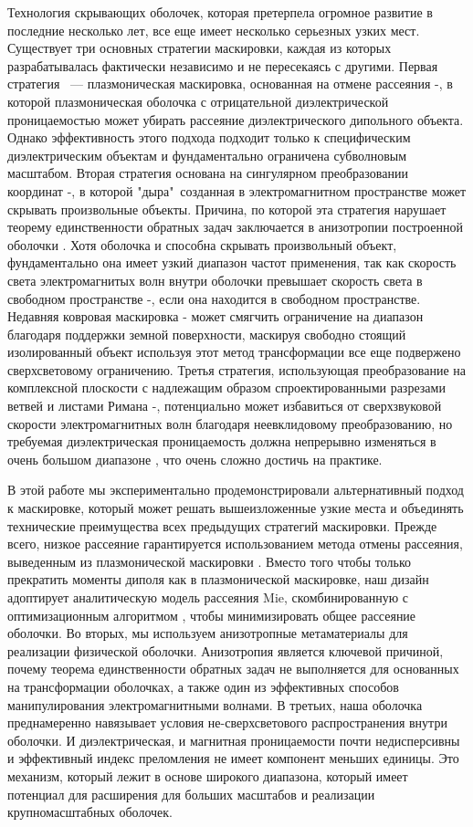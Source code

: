 \documentclass[a4paper, 12pt]{article}
\begin{document}
Технология скрывающих оболочек, которая претерпела огромное развитие в 
последние несколько лет, все еще имеет несколько серьезных узких мест.
Существует три основных стратегии маскировки, каждая из которых разрабатывалась
фактически независимо и не пересекаясь с другими. Первая стратегия ~--- 
плазмоническая маскировка, основанная на отмене рассеяния 
\cite{1}-\cite{3}, в которой
плазмоническая оболочка с отрицательной диэлектрической проницаемостью может
убирать рассеяние диэлектрического дипольного объекта. Однако эффективность
этого подхода подходит только к специфическим диэлектрическим объектам
и фундаментально ограничена субволновым масштабом. Вторая стратегия основана
на сингулярном преобразовании координат \cite{4}-\cite{7}, 
в которой "дыра"\, созданная
в электромагнитном пространстве может скрывать произвольные объекты. 
Причина, по которой эта стратегия нарушает теорему единственности обратных
задач заключается в анизотропии построенной оболочки \cite{5}. Хотя оболочка и 
способна скрывать произвольный объект, фундаментально она имеет узкий диапазон
частот применения, так как скорость света электромагнитых волн внутри оболочки
превышает скорость света в свободном пространстве \cite{8}-\cite{10}, 
если она находится в свободном
пространстве. Недавняя ковровая маскировка \cite{11}-\cite{18} 
может смягчить ограничение
на диапазон благодаря поддержки земной поверхности, маскируя свободно стоящий
изолированный объект используя этот метод трансформации все еще подвержено
сверхсветовому ограничению. Третья стратегия, использующая преобразование
на комплексной плоскости с надлежащим образом спроектированными разрезами 
ветвей и листами Римана \cite{19}-\cite{20}, потенциально может избавиться от 
сверхзвуковой скорости электромагнитных волн благодаря неевклидовому 
преобразованию, но требуемая диэлектрическая проницаемость должна непрерывно 
изменяться в очень большом диапазоне \cite{21}, 
что очень сложно достичь на практике. 

В этой работе мы экспериментально продемонстрировали альтернативный подход
к маскировке, который может решать вышеизложенные узкие места и объединять
технические преимущества всех предыдущих стратегий маскировки. Прежде всего,
низкое рассеяние гарантируется использованием метода отмены рассеяния,
выведенным из плазмонической маскировки \cite{1}. Вместо того чтобы только 
прекратить моменты диполя как в плазмонической маскировке, наш дизайн
адоптирует аналитическую модель рассеяния Mie, скомбинированную с 
оптимизационным алгоритмом \cite{22}, 
чтобы минимизировать общее рассеяние оболочки.
Во вторых, мы используем анизотропные метаматериалы для реализации физической
оболочки. Анизотропия является ключевой причиной, почему теорема единственности
обратных задач не выполняется для основанных на трансформации оболочках, а 
также один из эффективных способов манипулирования электромагнитными волнами.
В третьих, наша оболочка преднамеренно навязывает условия не-сверхсветового
распространения внутри оболочки. И диэлектрическая, и магнитная проницаемости
почти недисперсивны и эффективный индекс преломления не имеет компонент меньших единицы. Это механизм, который лежит в основе широкого диапазона,
который имеет потенциал для расширения для больших масштабов и реализации
крупномасштабных оболочек.
\end{document}
